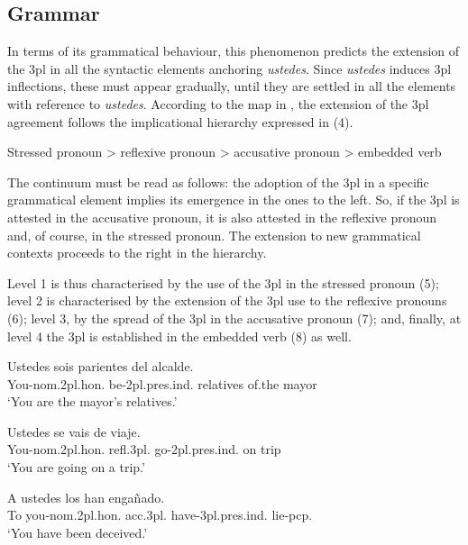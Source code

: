 \documentclass[output=paper]{LSP/langsci}
\begin{document}
\subsection{Grammar}
In terms of its grammatical behaviour, this phenomenon predicts the extension of the 3pl in all the syntactic elements anchoring \textit{ustedes}. Since \textit{ustedes} induces 3pl inflections, these must appear gradually, until they are settled in all the elements with reference to \textit{ustedes}. According to the map in , the extension of the 3pl agreement follows the implicational hierarchy expressed in (4).

\begin{exe}
\ex Stressed pronoun {\textgreater} reflexive pronoun {\textgreater} accusative pronoun {\textgreater} embedded verb
\end{exe}

The continuum must be read as follows: the adoption of the 3pl in a specific grammatical element implies its emergence in the ones to the left. So, if the 3pl is attested in the accusative pronoun, it is also attested in the reflexive pronoun and, of course, in the stressed pronoun. The extension to new grammatical contexts proceeds to the right in the hierarchy.

Level 1 is thus characterised by the use of the 3pl in the stressed pronoun (5); level 2 is characterised by the extension of the  3pl use to the reflexive pronouns (6); level 3, by the spread of the 3pl in the accusative pronoun (7); and, finally, at level 4 the 3pl is established in the embedded verb (8) as well.

\ea
\gll Ustedes                   sois                      parientes del     alcalde.\\
You-nom.2pl.hon. be-2pl.pres.ind. relatives of.the mayor\\
\glt   ‘You are the mayor’s relatives.’\\
\z

\ea
\gll Ustedes                    se            vais                      de viaje.\\
You-nom.2pl.hon. refl.3pl. go-2pl.pres.ind. on trip\\
\glt   ‘You are going on a trip.’\\
\z

\ea
\gll A  ustedes                    los          han                          engañado.\\
To you-nom.2pl.hon. acc.3pl. have-3pl.pres.ind. lie-pcp.\\
\glt   ‘You have been deceived.’\\
\z
\end{document}
